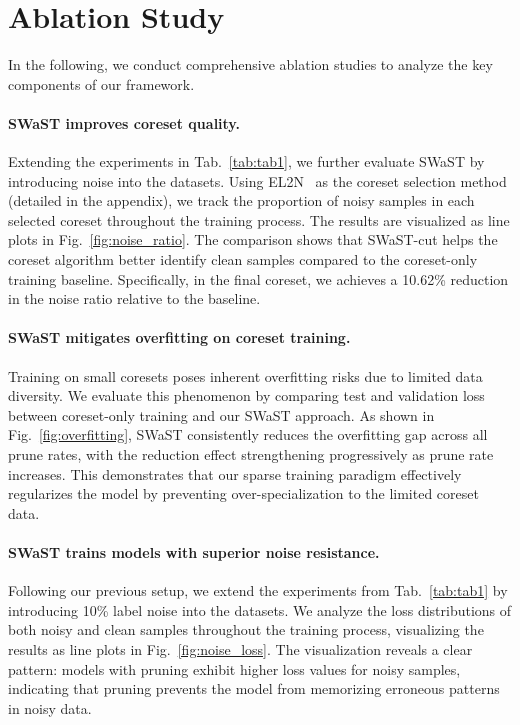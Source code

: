 \section{Ablation Study}  
In the following, we conduct comprehensive ablation studies to analyze the key components of our framework. 

\paragraph{SWaST improves coreset quality.} Extending the experiments in Tab.~\ref{tab:tab1}, we further evaluate SWaST by introducing noise into the datasets. Using EL2N~\cite{paul2021deep} as the coreset selection method (detailed in the appendix), we track the proportion of noisy samples in each selected coreset throughout the training process. The results are visualized as line plots in Fig.~\ref{fig:noise_ratio}. The comparison shows that SWaST-cut helps the coreset algorithm better identify clean samples compared to the coreset-only training baseline. Specifically, in the final coreset, we achieves a 10.62\% reduction in the noise ratio relative to the baseline.

\paragraph{SWaST mitigates overfitting on coreset training.} 
Training on small coresets poses inherent overfitting risks due to limited data diversity. We evaluate this phenomenon by comparing test and validation loss between coreset-only training and our SWaST approach. As shown in Fig.~\ref{fig:overfitting}, SWaST consistently reduces the overfitting gap across all prune rates, with the reduction effect strengthening progressively as prune rate increases. This demonstrates that our sparse training paradigm effectively regularizes the model by preventing over-specialization to the limited coreset data. 

\paragraph{SWaST trains models with superior noise resistance.}
Following our previous setup, we extend the experiments from Tab.~\ref{tab:tab1} by introducing 10\% label noise into the datasets. We analyze the loss distributions of both noisy and clean samples throughout the training process, visualizing the results as line plots in Fig.~\ref{fig:noise_loss}. The visualization reveals a clear pattern: models with pruning exhibit higher loss values for noisy samples, indicating that pruning prevents the model from memorizing erroneous patterns in noisy data.  

